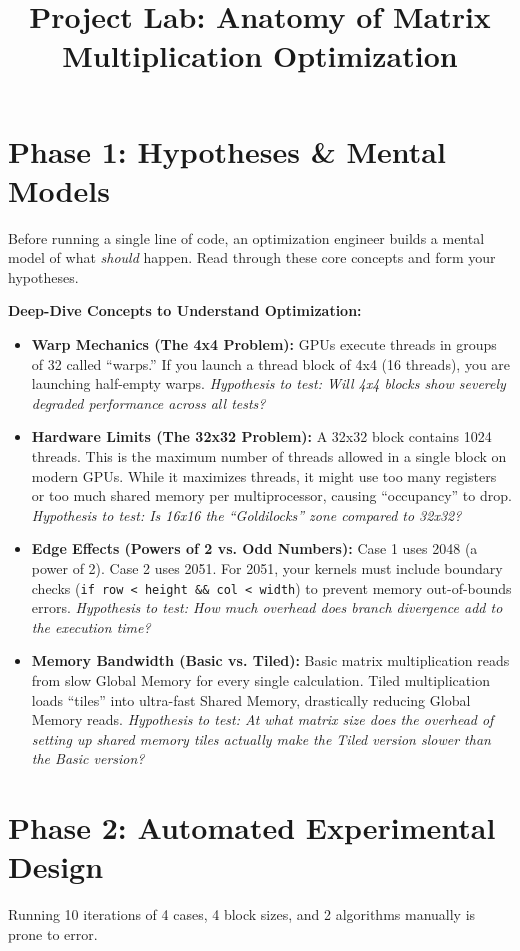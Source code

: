 \documentclass{article}
\title{\textbf{Project Lab: Anatomy of Matrix Multiplication Optimization}}
\author{}
\date{}
\begin{document}
\maketitle

\section*{Phase 1: Hypotheses \& Mental Models}
Before running a single line of code, an optimization engineer builds a mental model of what \textit{should} happen. Read through these core concepts and form your hypotheses.

\textbf{Deep-Dive Concepts to Understand Optimization:}
\begin{itemize}
    \item \textbf{Warp Mechanics (The 4x4 Problem):} GPUs execute threads in groups of 32 called ``warps.'' If you launch a thread block of 4x4 (16 threads), you are launching half-empty warps. \textit{Hypothesis to test: Will 4x4 blocks show severely degraded performance across all tests?}
    \item \textbf{Hardware Limits (The 32x32 Problem):} A 32x32 block contains 1024 threads. This is the maximum number of threads allowed in a single block on modern GPUs. While it maximizes threads, it might use too many registers or too much shared memory per multiprocessor, causing ``occupancy'' to drop. \textit{Hypothesis to test: Is 16x16 the ``Goldilocks'' zone compared to 32x32?}
    \item \textbf{Edge Effects (Powers of 2 vs. Odd Numbers):} Case 1 uses 2048 (a power of 2). Case 2 uses 2051. For 2051, your kernels must include boundary checks (\texttt{if row < height \&\& col < width}) to prevent memory out-of-bounds errors. \textit{Hypothesis to test: How much overhead does branch divergence add to the execution time?}
    \item \textbf{Memory Bandwidth (Basic vs. Tiled):} Basic matrix multiplication reads from slow Global Memory for every single calculation. Tiled multiplication loads ``tiles'' into ultra-fast Shared Memory, drastically reducing Global Memory reads. \textit{Hypothesis to test: At what matrix size does the overhead of setting up shared memory tiles actually make the Tiled version slower than the Basic version?}
\end{itemize}

\section*{Phase 2: Automated Experimental Design}
Running 10 iterations of 4 cases, 4 block sizes, and 2 algorithms manually is prone to error. 
\end{document}
